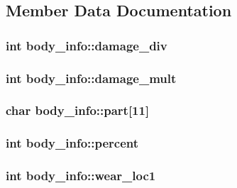 \subsection{Member Data Documentation}
\hypertarget{structbody__info_a48e556b563871623678fe8f73eda943b}{
\subsubsection[{damage\-\_\-div}]{\setlength{\rightskip}{0pt plus 5cm}int body\-\_\-info\-::damage\-\_\-div}}\label{structbody__info_a48e556b563871623678fe8f73eda943b}
\hypertarget{structbody__info_a48f0f282718fa5719f638768c17bcebf}{
\subsubsection[{damage\-\_\-mult}]{\setlength{\rightskip}{0pt plus 5cm}int body\-\_\-info\-::damage\-\_\-mult}}\label{structbody__info_a48f0f282718fa5719f638768c17bcebf}
\hypertarget{structbody__info_a9d4ecf947592ededfe1a36b502fc78bb}{
\subsubsection[{part}]{\setlength{\rightskip}{0pt plus 5cm}char body\-\_\-info\-::part\mbox{[}11\mbox{]}}}\label{structbody__info_a9d4ecf947592ededfe1a36b502fc78bb}
\hypertarget{structbody__info_ad73b391a0e0de991e6e2b7e1c5bce50c}{
\subsubsection[{percent}]{\setlength{\rightskip}{0pt plus 5cm}int body\-\_\-info\-::percent}}\label{structbody__info_ad73b391a0e0de991e6e2b7e1c5bce50c}
\hypertarget{structbody__info_aca020bc5a0f3b41c37ff6ac4644f533a}{
\subsubsection[{wear\-\_\-loc1}]{\setlength{\rightskip}{0pt plus 5cm}int body\-\_\-info\-::wear\-\_\-loc1}}\label{structbody__info_aca020bc5a0f3b41c37ff6ac4644f533a}
